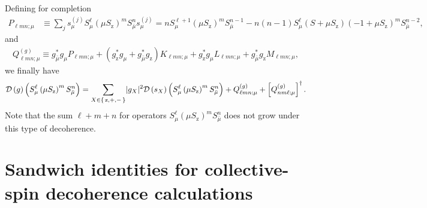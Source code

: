 \documentclass[aps,pra,twocolumn,longbibliography]{revtex4-2}
\newcommand{\p}[1]{\left( #1 \right)} %
\renewcommand{\sp}[1]{\left[ #1 \right]} %
\renewcommand{\abs}[1]{\lvert #1 \rvert}
\newcommand{\D}{\mathcal{D}}
\newcommand{\z}{\text{z}}
\newcommand{\bmu}{{\bar\mu}}
\newcommand{\1}{\mathds{1}}
\begin{document}
Defining for completion
\begin{align}
  P_{\ell mn;\mu}
  &\equiv \sum_j s_\mu^{(j)} S_\mu^\ell
  \p{\mu S_\z}^m S_\bmu^n s_\mu^{(j)}
  = n S_\mu^{\ell+1} \p{\mu S_\z}^m S_\bmu^{n-1}
  - n\p{n-1} S_\mu^\ell \p{S+\mu S_\z} \p{-1+\mu S_\z}^m S_\bmu^{n-2},
\end{align}
and
\begin{align}
  Q_{\ell mn;\mu}^{(g)}
  \equiv g_\bmu^* g_\mu P_{\ell mn;\mu}
  + \p{g_\z^* g_\mu + g_\bmu^* g_\z}
  K_{\ell mn;\mu}
  + g_\z^* g_\mu L_{\ell mn;\mu}
  + g_\bmu^* g_\z M_{\ell mn;\mu},
  \label{eq:Q_single}
\end{align}
we finally have
\begin{align}
  \D\p{g} \p{S_\mu^\ell \p{\mu S_\z}^m S_\bmu^n}
  = \sum_{X\in\set{\z,+,-}} \abs{g_X}^2
  \D\p{s_X} \p{S_\mu^\ell \p{\mu S_\z}^m S_\bmu^n}
  + Q_{\ell mn;\mu}^{(g)} + \sp{Q_{nm\ell;\mu}^{(g)}}^\dag.
\end{align}
Note that the sum $\ell+m+n$ for operators
$S_\mu^\ell \p{\mu S_\z}^m S_\bmu^n$ does not grow under this type of
decoherence.

\section{Sandwich identities for collective-spin decoherence
  calculations}
\label{sec:sandwich_collective}
\end{document}
